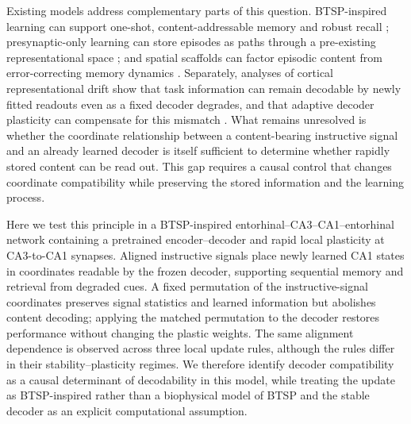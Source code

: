 \documentclass[11pt]{article}
\begin{document}
Existing models address complementary parts of this question. BTSP-inspired learning can support one-shot, content-addressable memory and robust recall \citep{wu2025}; presynaptic-only learning can store episodes as paths through a pre-existing representational space \citep{pang2025}; and spatial scaffolds can factor episodic content from error-correcting memory dynamics \citep{chandra2025}. Separately, analyses of cortical representational drift show that task information can remain decodable by newly fitted readouts even as a fixed decoder degrades, and that adaptive decoder plasticity can compensate for this mismatch \citep{rule2020}. What remains unresolved is whether the coordinate relationship between a content-bearing instructive signal and an already learned decoder is itself sufficient to determine whether rapidly stored content can be read out. This gap requires a causal control that changes coordinate compatibility while preserving the stored information and the learning process.

Here we test this principle in a BTSP-inspired entorhinal--CA3--CA1--entorhinal network containing a pretrained encoder--decoder and rapid local plasticity at CA3-to-CA1 synapses. Aligned instructive signals place newly learned CA1 states in coordinates readable by the frozen decoder, supporting sequential memory and retrieval from degraded cues. A fixed permutation of the instructive-signal coordinates preserves signal statistics and learned information but abolishes content decoding; applying the matched permutation to the decoder restores performance without changing the plastic weights. The same alignment dependence is observed across three local update rules, although the rules differ in their stability--plasticity regimes. We therefore identify decoder compatibility as a causal determinant of decodability in this model, while treating the update as BTSP-inspired rather than a biophysical model of BTSP and the stable decoder as an explicit computational assumption.



\end{document}

